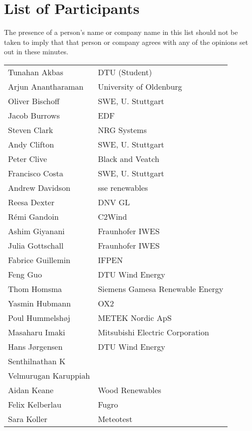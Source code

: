 \section*{List of Participants}

The presence of a person's name or company name in this list should not be taken to imply that that person or company agrees with any of the opinions set out in these minutes.

\begin{supertabular}{@{}|p{0.45\columnwidth}|p{0.55\columnwidth}|@{}}
Tunahan Akbas & DTU (Student) \\
Arjun Anantharaman & University of Oldenburg \\
Oliver Bischoff & SWE, U. Stuttgart \\
 Jacob Burrows & EDF \\
 Steven Clark & NRG Systems \\
 Andy Clifton & SWE, U. Stuttgart \\
 Peter Clive & Black and Veatch \\
 Francisco Costa & SWE, U. Stuttgart \\
 Andrew Davidson & sse renewables \\
 Reesa Dexter & DNV GL \\
 Rémi Gandoin & C2Wind \\
 Ashim Giyanani & Fraunhofer IWES \\
 Julia Gottschall & Fraunhofer IWES \\
 Fabrice Guillemin & IFPEN \\
 Feng Guo & DTU Wind Energy \\
 Thom Homsma & Siemens Gamesa Renewable Energy \\
 Yasmin Hubmann & OX2\\
 Poul Hummelshøj & METEK Nordic ApS \\
 Masaharu Imaki & Mitsubishi Electric Corporation \\
 Hans Jørgensen & DTU Wind Energy \\
 Senthilnathan K & \\
 Velmurugan Karuppiah & \\
 Aidan Keane & Wood Renewables \\
 Felix Kelberlau & Fugro \\
 Sara Koller & Meteotest \\

\end{supertabular}
